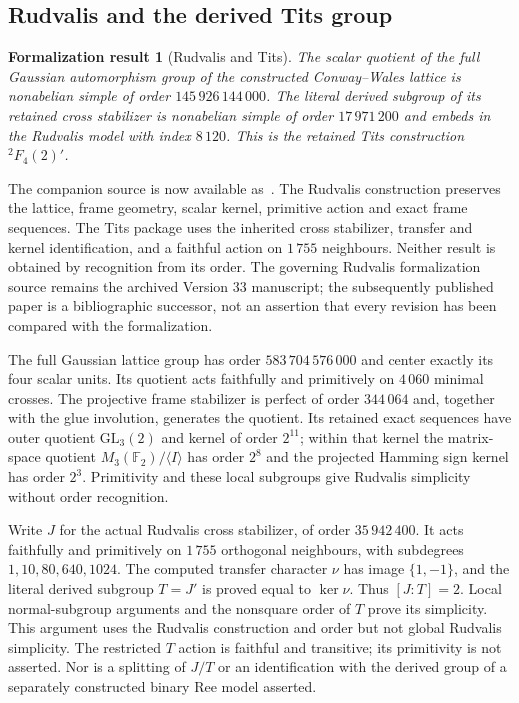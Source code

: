 \documentclass[11pt]{article}
\numberwithin{equation}{section}
\newtheorem{formalization}[theorem]{Formalization result}
\theoremstyle{definition}
\newcommand{\F}{\mathbb F}
\newcommand{\GL}{\mathrm{GL}}
\begin{document}
\subsection{Rudvalis and the derived Tits group}

\begin{formalization}[Rudvalis and Tits]\label{thm:rudvalis-tits}
The scalar quotient of the full Gaussian automorphism group of the constructed
Conway--Wales lattice is nonabelian simple of order $145\,926\,144\,000$.
The literal derived subgroup of its retained cross stabilizer is nonabelian
simple of order $17\,971\,200$ and embeds in the Rudvalis model with index
$8\,120$. This is the retained Tits construction $ {}^2F_4(2)'$.
\end{formalization}
The companion source is now available as~\cite{RudvalisHohn}. The Rudvalis construction preserves the lattice, frame geometry, scalar kernel,
primitive action and exact frame sequences. The Tits package uses the inherited
cross stabilizer, transfer and kernel identification, and a faithful action on
$1\,755$ neighbours. Neither result is obtained by recognition from its order.
The governing Rudvalis formalization source remains the archived Version 33
manuscript; the subsequently published paper is a bibliographic successor,
not an assertion that every revision has been compared with the formalization.

The full Gaussian lattice group has order $583\,704\,576\,000$ and
center exactly its four scalar units. Its quotient acts faithfully and
primitively on $4\,060$ minimal crosses. The projective frame stabilizer
is perfect of order $344\,064$ and, together with the glue involution,
generates the quotient. Its retained exact sequences have outer quotient
$\GL_3(2)$ and kernel of order $2^{11}$; within that kernel the
matrix-space quotient $M_3(\F_2)/\langle I\rangle$ has order $2^8$ and
the projected Hamming sign kernel has order $2^3$. Primitivity and these
local subgroups give Rudvalis simplicity without order recognition.

Write $J$ for the actual Rudvalis cross stabilizer, of order
$35\,942\,400$. It acts faithfully and primitively on $1\,755$
orthogonal neighbours, with subdegrees $1,10,80,640,1024$.
The computed transfer character $\nu$ has image $\{1,-1\}$, and the
literal derived subgroup $T=J'$ is proved equal to $\ker\nu$.
Thus $[J:T]=2$. Local normal-subgroup arguments and the nonsquare
order of $T$ prove its simplicity. This argument uses the Rudvalis
construction and order but not global Rudvalis simplicity. The restricted
$T$ action is faithful and transitive; its primitivity is not asserted.
Nor is a splitting of $J/T$ or an identification with the derived group
of a separately constructed binary Ree model asserted.
\end{document}
